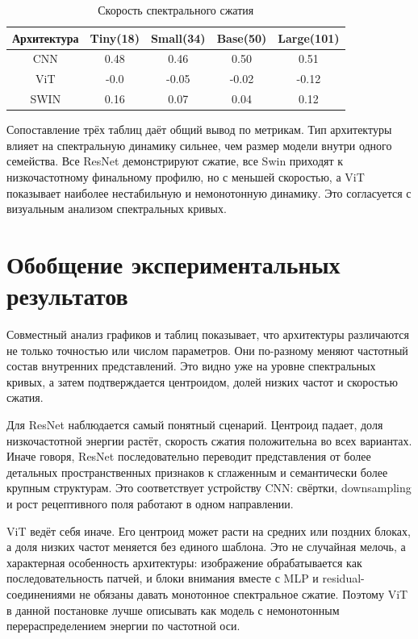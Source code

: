 \begin{table}[h]
\centering
\caption{Скорость спектрального сжатия} 
\label{tab:models_metrics}
\vspace{1ex} 

\begin{tabular}{ccccc} 
\toprule
\textbf{Архитектура} & \textbf{Tiny(18)} & \textbf{Small(34)} & \textbf{Base(50)} & \textbf{Large(101)} \\
\midrule
CNN    & 0.48 & 0.46  & 0.50  & 0.51 \\
ViT    & -0.0 & -0.05 & -0.02 & -0.12 \\
SWIN   & 0.16 & 0.07  & 0.04  & 0.12 \\
\bottomrule
\end{tabular}
\end{table}

Сопоставление трёх таблиц даёт общий вывод по метрикам. Тип архитектуры влияет на спектральную динамику сильнее, чем размер модели внутри одного семейства. Все ResNet демонстрируют сжатие, все Swin приходят к низкочастотному финальному профилю, но с меньшей скоростью, а ViT показывает наиболее нестабильную и немонотонную динамику. Это согласуется с визуальным анализом спектральных кривых.

\section{Обобщение экспериментальных результатов}

Совместный анализ графиков и таблиц показывает, что архитектуры различаются не только точностью или числом параметров. Они по-разному меняют частотный состав внутренних представлений. Это видно уже на уровне спектральных кривых, а затем подтверждается центроидом, долей низких частот и скоростью сжатия.

Для ResNet наблюдается самый понятный сценарий. Центроид падает, доля низкочастотной энергии растёт, скорость сжатия положительна во всех вариантах. Иначе говоря, ResNet последовательно переводит представления от более детальных пространственных признаков к сглаженным и семантически более крупным структурам. Это соответствует устройству CNN: свёртки, downsampling и рост рецептивного поля работают в одном направлении.

ViT ведёт себя иначе. Его центроид может расти на средних или поздних блоках, а доля низких частот меняется без единого шаблона. Это не случайная мелочь, а характерная особенность архитектуры: изображение обрабатывается как последовательность патчей, и блоки внимания вместе с MLP и residual-соединениями не обязаны давать монотонное спектральное сжатие. Поэтому ViT в данной постановке лучше описывать как модель с немонотонным перераспределением энергии по частотной оси.

